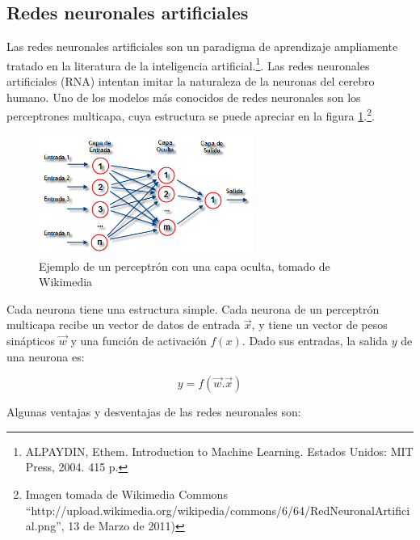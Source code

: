 \documentclass[a4paper, 11pt, oneside]{report}
\begin{document}
\subsection{Redes neuronales artificiales}

Las redes neuronales artificiales son un paradigma de aprendizaje ampliamente tratado en la literatura de la inteligencia artificial.\footnote{ALPAYDIN, Ethem. Introduction to Machine Learning. Estados Unidos: MIT Press, 2004. 415 p.}. Las redes neuronales artificiales (RNA) intentan imitar la naturaleza de la neuronas del cerebro humano. Uno de los modelos más conocidos de redes neuronales son los perceptrones multicapa, cuya estructura se puede apreciar en la figura \ref{fig:rna}.\footnote{Imagen tomada de Wikimedia Commons ``http://upload.wikimedia.org/wikipedia/commons/6/64/RedNeuronalArtificial.png'', 13 de Marzo de 2011)}.

	\begin{figure}[htb]
	\begin{center}
	\leavevmode
	\includegraphics[width=7cm]{img/rna.png}
	\end{center}
	\caption{Ejemplo de un perceptrón con una capa oculta, tomado de Wikimedia}
	\label{fig:rna}
	\end{figure}

Cada neurona tiene una estructura simple. Cada neurona de un perceptrón multicapa recibe un vector de datos de entrada $\vec{x}$, y tiene un vector de pesos sinápticos $\vec{w}$ y una función de activación $f(x)$. Dado sus entradas, la salida $y$ de una neurona es:

\[y = f(\vec{w}.\vec{x})\]

Algunas ventajas y desventajas de las redes neuronales son:
\end{document}
